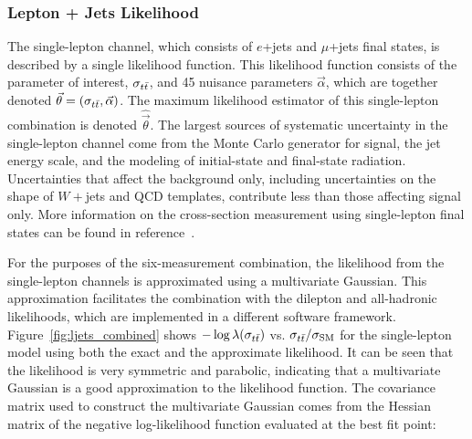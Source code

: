 
\subsubsection{Lepton + Jets Likelihood}


\label{sec:lepjets}

The single-lepton channel, which consists of $e$+jets and $\mu$+jets final states, is described by a single likelihood function.
This likelihood function consists of the parameter of interest, $\sigma_{t\bar{t}}$, and 45 nuisance parameters $\vec{\alpha}$, 
which are together denoted $\vec{\theta} = (\sigma_{t\bar{t}}, \vec{\alpha})$.
The maximum likelihood estimator of this single-lepton combination is denoted $\hat{\vec{\theta}}$.
The largest sources of systematic uncertainty in the single-lepton channel come from the Monte Carlo generator for signal, the jet energy scale, and the modeling of initial-state and final-state radiation.
Uncertainties that affect the background only, including uncertainties on the shape of $W+$jets and QCD templates, contribute less than those affecting signal only.
More information on the cross-section measurement using single-lepton final states can be found in reference~\cite{LEPTON_JETS_NOTE_2011}.

For the purposes of the six-measurement combination, the likelihood from the single-lepton channels is approximated using a multivariate Gaussian.
This approximation facilitates the combination with the dilepton and all-hadronic likelihoods, which are implemented in a different software framework.  
Figure~\ref{fig:ljets_combined} shows $-\log\lambda(\sigma_{t\bar{t}})$ vs. $\sigma_{t\bar{t}}/\sigma_{\rm SM}$ for the single-lepton model using both the exact and the approximate likelihood.
It can be seen that the likelihood is very symmetric and parabolic, indicating that a multivariate Gaussian is a good approximation to the likelihood function. 
The covariance matrix used to construct the multivariate Gaussian comes from the Hessian matrix of the negative log-likelihood function evaluated at the best fit point:




